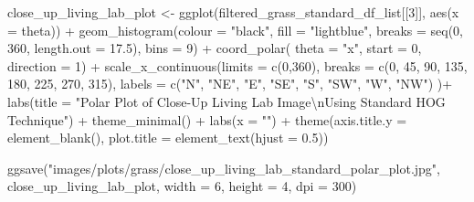 \documentclass[
  letterpaper,
  DIV=11,
  numbers=noendperiod]{scrreprt}
\newenvironment{Shaded}{\begin{snugshade}}{\end{snugshade}}
\newcommand{\AttributeTok}[1]{\textcolor[rgb]{0.40,0.45,0.13}{#1}}
\newcommand{\DecValTok}[1]{\textcolor[rgb]{0.68,0.00,0.00}{#1}}
\newcommand{\FloatTok}[1]{\textcolor[rgb]{0.68,0.00,0.00}{#1}}
\newcommand{\FunctionTok}[1]{\textcolor[rgb]{0.28,0.35,0.67}{#1}}
\newcommand{\NormalTok}[1]{\textcolor[rgb]{0.00,0.23,0.31}{#1}}
\newcommand{\OtherTok}[1]{\textcolor[rgb]{0.00,0.23,0.31}{#1}}
\newcommand{\SpecialCharTok}[1]{\textcolor[rgb]{0.37,0.37,0.37}{#1}}
\newcommand{\StringTok}[1]{\textcolor[rgb]{0.13,0.47,0.30}{#1}}
\begin{document}
\begin{Shaded}
\begin{Highlighting}[]
\NormalTok{close\_up\_living\_lab\_plot }\OtherTok{\textless{}{-}}
  \FunctionTok{ggplot}\NormalTok{(filtered\_grass\_standard\_df\_list[[}\DecValTok{3}\NormalTok{]], }
         \FunctionTok{aes}\NormalTok{(}\AttributeTok{x =}\NormalTok{ theta)) }\SpecialCharTok{+}
  \FunctionTok{geom\_histogram}\NormalTok{(}\AttributeTok{colour =} \StringTok{"black"}\NormalTok{, }
                 \AttributeTok{fill =} \StringTok{"lightblue"}\NormalTok{, }
                 \AttributeTok{breaks =} \FunctionTok{seq}\NormalTok{(}\DecValTok{0}\NormalTok{, }\DecValTok{360}\NormalTok{, }\AttributeTok{length.out =} \FloatTok{17.5}\NormalTok{),}
                 \AttributeTok{bins =} \DecValTok{9}\NormalTok{) }\SpecialCharTok{+}
  \FunctionTok{coord\_polar}\NormalTok{(}
    \AttributeTok{theta =} \StringTok{"x"}\NormalTok{, }
    \AttributeTok{start =} \DecValTok{0}\NormalTok{, }
    \AttributeTok{direction =} \DecValTok{1}\NormalTok{) }\SpecialCharTok{+}
  \FunctionTok{scale\_x\_continuous}\NormalTok{(}\AttributeTok{limits =} \FunctionTok{c}\NormalTok{(}\DecValTok{0}\NormalTok{,}\DecValTok{360}\NormalTok{),}
    \AttributeTok{breaks =} \FunctionTok{c}\NormalTok{(}\DecValTok{0}\NormalTok{, }\DecValTok{45}\NormalTok{, }\DecValTok{90}\NormalTok{, }\DecValTok{135}\NormalTok{, }\DecValTok{180}\NormalTok{, }\DecValTok{225}\NormalTok{, }\DecValTok{270}\NormalTok{, }\DecValTok{315}\NormalTok{), }
    \AttributeTok{labels =} \FunctionTok{c}\NormalTok{(}\StringTok{"N"}\NormalTok{, }\StringTok{"NE"}\NormalTok{, }\StringTok{"E"}\NormalTok{, }\StringTok{"SE"}\NormalTok{, }\StringTok{"S"}\NormalTok{, }\StringTok{"SW"}\NormalTok{, }\StringTok{"W"}\NormalTok{, }\StringTok{"NW"}\NormalTok{)}
\NormalTok{  )}\SpecialCharTok{+}
  \FunctionTok{labs}\NormalTok{(}\AttributeTok{title =} \StringTok{"Polar Plot of Close{-}Up Living Lab Image}\SpecialCharTok{\textbackslash{}n}\StringTok{Using Standard HOG Technique"}\NormalTok{) }\SpecialCharTok{+}
  \FunctionTok{theme\_minimal}\NormalTok{() }\SpecialCharTok{+}
  \FunctionTok{labs}\NormalTok{(}\AttributeTok{x =} \StringTok{""}\NormalTok{) }\SpecialCharTok{+}
  \FunctionTok{theme}\NormalTok{(}\AttributeTok{axis.title.y =} \FunctionTok{element\_blank}\NormalTok{(),}
        \AttributeTok{plot.title =} \FunctionTok{element\_text}\NormalTok{(}\AttributeTok{hjust =} \FloatTok{0.5}\NormalTok{))}

\FunctionTok{ggsave}\NormalTok{(}\StringTok{"images/plots/grass/close\_up\_living\_lab\_standard\_polar\_plot.jpg"}\NormalTok{, close\_up\_living\_lab\_plot, }\AttributeTok{width =} \DecValTok{6}\NormalTok{, }\AttributeTok{height =} \DecValTok{4}\NormalTok{, }\AttributeTok{dpi =} \DecValTok{300}\NormalTok{)}
\end{Highlighting}
\end{Shaded}
\end{document}
